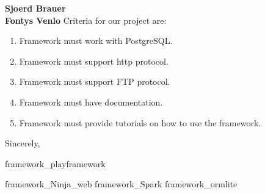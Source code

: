 \documentclass[11pt]{letter} %
\begin{document}
\begin{letter}{\large \bfseries Sjoerd Brauer\\ Fontys Venlo }
		Criteria for our project are:
		\begin{enumerate}
			\item Framework must work with PostgreSQL.
			\item Framework must support http protocol.
			\item Framework must support FTP protocol.
			\item Framework must have documentation.
			\item Framework must provide tutorials on how to use the framework.
		\end{enumerate}
	
		\closing{Sincerely,}
		
		
		
		
		
		
		
		 {framework_playframework}
		
		 {framework_Ninja_web}
		 {framework_Spark}
		 {framework_ormlite}
		







	

		
		
		
		
		
		
	\end{letter}
	
\end{document}
